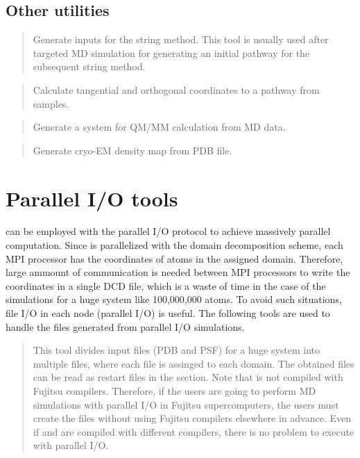 \documentclass[a4paper,11pt,oneside,english]{sphinxmanual}
\begin{document}
\subsection{Other utilities}
\label{\detokenize{02_Available_Programs:other-utilities}}
\begin{quote}

Generate inputs for the string method.
This tool is usually used after targeted MD simulation
for generating an initial pathway for the subsequent string method.
\end{quote}

\begin{quote}

Calculate tangential and orthogonal coordinates to a pathway from samples.
\end{quote}

\begin{quote}

Generate a system for QM/MM calculation from MD data.
\end{quote}

\begin{quote}

Generate cryo-EM density map from PDB file.
\end{quote}


\section{Parallel I/O tools}
\label{\detokenize{02_Available_Programs:parallel-i-o-tools}}
 can be employed with the parallel I/O protocol to achieve massively parallel computation.
Since  is parallelized with the domain decomposition scheme,
each MPI processor has the coordinates of atoms in the assigned domain.
Therefore, large ammount of communication is needed between MPI processors
to write the coordinates in a single DCD file, which is a waste of time
in the case of the simulations for a huge system like 100,000,000 atoms.
To avoid such situations, file I/O in each node (parallel I/O) is useful.
The following tools are used to handle the files generated from parallel I/O simulations.

\begin{quote}

This tool divides input files (PDB and PSF) for a huge system into multiple files,
where each file is assinged to each domain.
The obtained files can be read as restart files in the \sphinxstylestrong{{[}INPUT{]}} section.
Note that  is not compiled with Fujitsu compilers.
Therefore, if the users are going to perform MD simulations with parallel I/O in Fujitsu supercomputers,
the users must create the files without using Fujitsu compilers elsewhere in advance.
Even if  and  are compiled with different compilers,
there is no problem to execute  with parallel I/O.
\end{quote}
\end{document}
